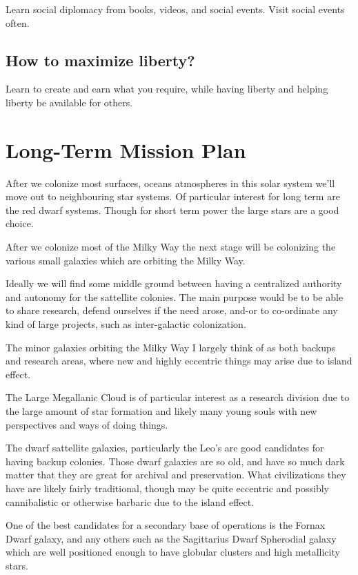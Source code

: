 \documentclass{report}
\begin{document}
Learn social diplomacy from books, videos, and social events.
Visit social events often.

\subsection{How to maximize liberty?}

Learn to create and earn what you require,
while having liberty and helping liberty be available for others.


\section{Long-Term Mission Plan}\label{intergalacticmission}

After we colonize most surfaces, oceans atmospheres in this solar system we'll
move out to neighbouring star systems.  Of particular interest for long term are
the red dwarf systems.  Though for short term power the large stars are a good
choice. 

After we colonize most of the Milky Way the next stage will be colonizing the
various small galaxies which are orbiting the Milky Way. 

Ideally we will find some middle ground between having a centralized authority
and autonomy for the sattellite colonies.  The main purpose would be to be able
to share research, defend ourselves if the need arose, and-or to co-ordinate any kind of large
projects, such as inter-galactic colonization.

The minor galaxies orbiting the Milky Way I largely think of as both backups and
research areas, where new and highly eccentric things may arise due to island
effect. 

The Large Megallanic Cloud is of particular interest as a research
division due to the large amount of star formation and likely many young souls
with new perspectives and ways of doing things. 

The dwarf sattellite galaxies, particularly the Leo's are good candidates for 
having backup colonies. Those dwarf galaxies are so old, and have so much dark
matter that they are great for archival and preservation. What civilizations
they have are likely fairly traditional, though may be quite eccentric and
possibly cannibalistic or otherwise barbaric due to the island effect. 

One of the best candidates for a secondary base of operations is the Fornax
Dwarf galaxy, and any others such as the Sagittarius Dwarf Spherodial galaxy 
which are well positioned enough to have globular clusters and 
high metallicity stars.
\end{document}
